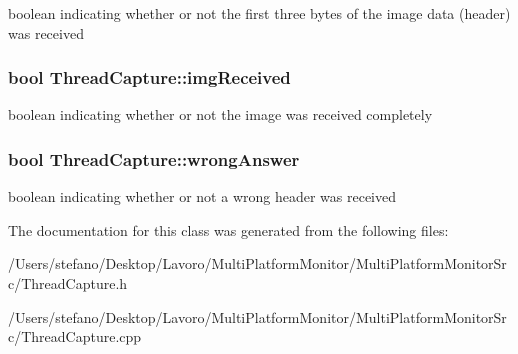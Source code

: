 boolean indicating whether or not the first three bytes of the image data (header) was received 
\subsubsection[imgReceived]{\setlength{\rightskip}{0pt plus 5cm}bool {\bf ThreadCapture::imgReceived}}\label{class_thread_capture_8432b3edf300d289b2d419f6da0b2bde}


boolean indicating whether or not the image was received completely 
\subsubsection[wrongAnswer]{\setlength{\rightskip}{0pt plus 5cm}bool {\bf ThreadCapture::wrongAnswer}}\label{class_thread_capture_170678562a7c37d44c162613b2ce42cb}


boolean indicating whether or not a wrong header was received 

The documentation for this class was generated from the following files:\begin{CompactItemize}
\item 
/Users/stefano/Desktop/Lavoro/MultiPlatformMonitor/MultiPlatformMonitorSrc/ThreadCapture.h\item 
/Users/stefano/Desktop/Lavoro/MultiPlatformMonitor/MultiPlatformMonitorSrc/ThreadCapture.cpp\end{CompactItemize}
